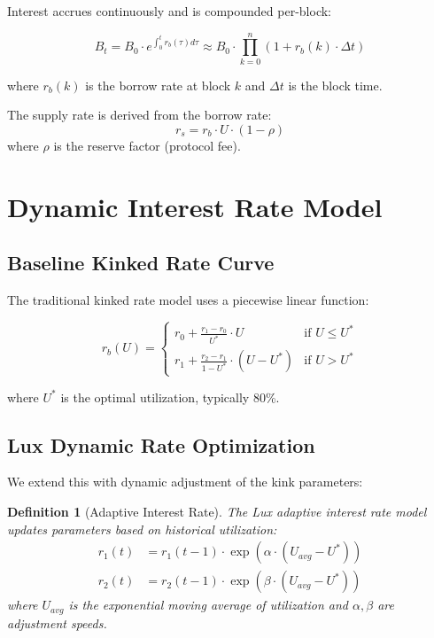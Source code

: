 \documentclass[11pt,a4paper]{article}
\newtheorem{definition}[theorem]{Definition}
\begin{document}
Interest accrues continuously and is compounded per-block:

\begin{equation}
    B_t = B_0 \cdot e^{\int_0^t r_b(\tau) d\tau} \approx B_0 \cdot \prod_{k=0}^{n} (1 + r_b(k) \cdot \Delta t)
\end{equation}

where $r_b(k)$ is the borrow rate at block $k$ and $\Delta t$ is the block time.

The supply rate is derived from the borrow rate:
\begin{equation}
    r_s = r_b \cdot U \cdot (1 - \rho)
\end{equation}
where $\rho$ is the reserve factor (protocol fee).

\section{Dynamic Interest Rate Model}

\subsection{Baseline Kinked Rate Curve}

The traditional kinked rate model uses a piecewise linear function:

\begin{equation}
    r_b(U) = \begin{cases}
        r_0 + \frac{r_1 - r_0}{U^*} \cdot U & \text{if } U \leq U^* \\
        r_1 + \frac{r_2 - r_1}{1 - U^*} \cdot (U - U^*) & \text{if } U > U^*
    \end{cases}
\end{equation}

where $U^*$ is the optimal utilization, typically 80\%.

\subsection{Lux Dynamic Rate Optimization}

We extend this with dynamic adjustment of the kink parameters:

\begin{definition}[Adaptive Interest Rate]
The Lux adaptive interest rate model updates parameters based on historical utilization:
\begin{align}
    r_1(t) &= r_1(t-1) \cdot \exp\left(\alpha \cdot (U_{avg} - U^*)\right) \\
    r_2(t) &= r_2(t-1) \cdot \exp\left(\beta \cdot (U_{avg} - U^*)\right)
\end{align}
where $U_{avg}$ is the exponential moving average of utilization and $\alpha, \beta$ are adjustment speeds.
\end{definition}
\end{document}
